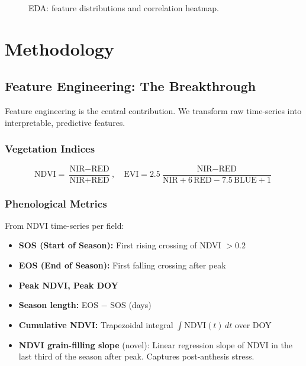 \documentclass[conference]{IEEEtran}
\begin{document}
\begin{figure}[t]
  \centering
  \caption{EDA: feature distributions and correlation heatmap.}
  \label{fig:eda}
\end{figure}

\section{Methodology}
\label{sec:method}

\subsection{Feature Engineering: The Breakthrough}

Feature engineering is the central contribution. We transform raw time-series into interpretable, predictive features.

\subsubsection{Vegetation Indices}
\begin{equation}
  \text{NDVI} = \frac{\text{NIR} - \text{RED}}{\text{NIR} + \text{RED}}, \quad
  \text{EVI} = 2.5 \frac{\text{NIR} - \text{RED}}{\text{NIR} + 6\,\text{RED} - 7.5\,\text{BLUE} + 1}
\end{equation}

\subsubsection{Phenological Metrics}

From NDVI time-series per field:
\begin{itemize}
  \item \textbf{SOS (Start of Season):} First rising crossing of NDVI $> 0.2$
  \item \textbf{EOS (End of Season):} First falling crossing after peak
  \item \textbf{Peak NDVI, Peak DOY}
  \item \textbf{Season length:} EOS $-$ SOS (days)
  \item \textbf{Cumulative NDVI:} Trapezoidal integral $\int \text{NDVI}(t)\,dt$ over DOY
  \item \textbf{NDVI grain-filling slope} (novel): Linear regression slope of NDVI in the last third of the season after peak. Captures post-anthesis stress.
\end{itemize}
\end{document}

